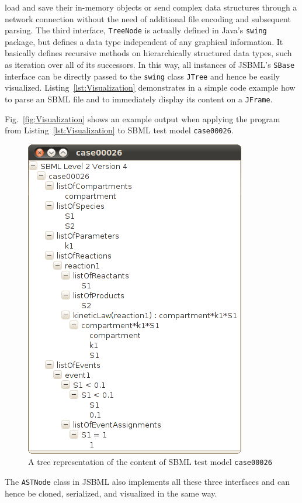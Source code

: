 \documentclass[
  BCOR12mm,
  letterpaper,
  11pt,
  headsepline,
  pointlessnumbers,
  tablecaptionabove,
  onelinecaption,
  headinclude,
  appendixprefix,
  idxtotoc,
  bibtotoc,
  twoside,
  titlepage
]{scrartcl}
\begin{document}
load and save their in-memory objects or send complex data structures
through a network connection without the need of additional file encoding and
subsequent parsing. The third interface, \texttt{TreeNode} is actually defined in
Java's \texttt{swing} package, but defines a data type independent of any
graphical information. It basically defines recursive methods on hierarchically
structured data types, such as iteration over all of its successors. In this
way, all instances of JSBML's \texttt{SBase} interface can be directly passed to
the \texttt{swing} class \texttt{JTree} and hence be easily visualized.
Listing~\vref{lst:Visualization} demonstrates in a simple code example how to
parse an SBML file and to immediately display its content on a \texttt{JFrame}.

Fig.~\vref{fig:Visualization} shows an example output when applying the program
from Listing~\vref{lst:Visualization} to SBML test model \texttt{case00026}.
\begin{figure}
\includegraphics[width=.35\textwidth]{posters/2010_ICSB_and_COMBINE/JSBMLvisualizerTransparent}
\caption[Tree representation of an SBML file]{A tree representation of the
content of SBML test model \texttt{case00026}}
\label{fig:Visualization}
\end{figure}
The \texttt{ASTNode} class in JSBML also implements all these three interfaces and
can hence be cloned, serialized, and visualized in the same way.
\end{document}
